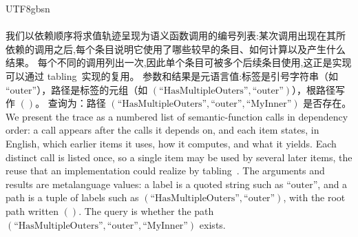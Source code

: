 \begin{CJK*}{UTF8}{gbsn}
\paragraph{}
\ifPaperChinese
我们以依赖顺序将求值轨迹呈现为语义函数调用的编号列表:某次调用出现在其所依赖的调用之后,每个条目说明它使用了哪些较早的条目、如何计算以及产生什么结果。
每个不同的调用列出一次,因此单个条目可被多个后续条目使用,这正是实现可以通过 tabling~\cite{tamaki1986-tabled-resolution}实现的复用。
参数和结果是元语言值:标签是引号字符串（如 $\text{``outer''}$），路径是标签的元组（如 $(\text{``HasMultipleOuters''}, \text{``outer''})$），根路径写作 $()$。
查询为：路径 $(\text{``HasMultipleOuters''}, \text{``outer''}, \text{``MyInner''})$ 是否存在。
\else
We present the trace as a numbered list of semantic-function calls in
dependency order: a call appears after the calls it depends on, and each
item states, in English, which earlier items it uses, how it computes, and
what it yields. Each distinct call is listed once, so a single item may be
used by several later items, the reuse that an implementation could realize
by tabling~\cite{tamaki1986-tabled-resolution}.
The arguments and results are metalanguage values: a label is a quoted
string such as $\text{``outer''}$, and a path is a tuple of labels such as
$(\text{``HasMultipleOuters''}, \text{``outer''})$, with the root path
written $()$.
The query is whether the path
$(\text{``HasMultipleOuters''}, \text{``outer''}, \text{``MyInner''})$ exists.
\fi

\begin{breakablepathcommas}
\raggedright

\end{breakablepathcommas}


\end{CJK*}
